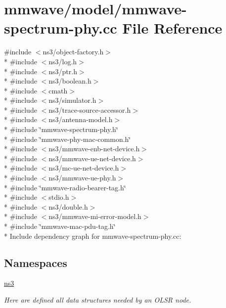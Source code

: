 \hypertarget{mmwave-spectrum-phy_8cc}{}\section{mmwave/model/mmwave-\/spectrum-\/phy.cc File Reference}
\label{mmwave-spectrum-phy_8cc}
{\ttfamily \#include $<$ns3/object-\/factory.\+h$>$}\\*
{\ttfamily \#include $<$ns3/log.\+h$>$}\\*
{\ttfamily \#include $<$ns3/ptr.\+h$>$}\\*
{\ttfamily \#include $<$ns3/boolean.\+h$>$}\\*
{\ttfamily \#include $<$cmath$>$}\\*
{\ttfamily \#include $<$ns3/simulator.\+h$>$}\\*
{\ttfamily \#include $<$ns3/trace-\/source-\/accessor.\+h$>$}\\*
{\ttfamily \#include $<$ns3/antenna-\/model.\+h$>$}\\*
{\ttfamily \#include \char`\"{}mmwave-\/spectrum-\/phy.\+h\char`\"{}}\\*
{\ttfamily \#include \char`\"{}mmwave-\/phy-\/mac-\/common.\+h\char`\"{}}\\*
{\ttfamily \#include $<$ns3/mmwave-\/enb-\/net-\/device.\+h$>$}\\*
{\ttfamily \#include $<$ns3/mmwave-\/ue-\/net-\/device.\+h$>$}\\*
{\ttfamily \#include $<$ns3/mc-\/ue-\/net-\/device.\+h$>$}\\*
{\ttfamily \#include $<$ns3/mmwave-\/ue-\/phy.\+h$>$}\\*
{\ttfamily \#include \char`\"{}mmwave-\/radio-\/bearer-\/tag.\+h\char`\"{}}\\*
{\ttfamily \#include $<$stdio.\+h$>$}\\*
{\ttfamily \#include $<$ns3/double.\+h$>$}\\*
{\ttfamily \#include $<$ns3/mmwave-\/mi-\/error-\/model.\+h$>$}\\*
{\ttfamily \#include \char`\"{}mmwave-\/mac-\/pdu-\/tag.\+h\char`\"{}}\\*
Include dependency graph for mmwave-\/spectrum-\/phy.cc\+:
\subsection*{Namespaces}
\begin{DoxyCompactItemize}
\item 
 \hyperlink{namespacens3}{ns3}
\begin{DoxyCompactList}\small\item\em Here are defined all data structures needed by an O\+L\+SR node. \end{DoxyCompactList}\end{DoxyCompactItemize}
